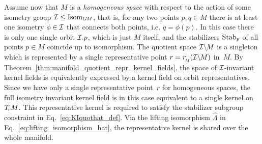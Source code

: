 Assume now that $M$ is a \emph{homogeneous space} with respect to the action of some isometry group $\mathcal{I} \leq \operatorname{Isom}_{G\mkern-1.4muM}$, that is, for any two points $p,q\in M$ there is at least one isometry $\phi \in \mathcal{I}$ that connects both points, i.e. $q = \phi(p)$.
In this case there is only one single orbit $\mathcal{I}.p$, which is just $M$ itself, and the stabilizers $\operatorname{Stab}_{p}$ of all points $p\in M$ coincide up to isomorphism.
The quotient space $\mathcal{I}\backslash\mkern-1.5mu M$ is a singleton which is represented by a single representative point $r = \rM(\IM)$ in~$M$.
By Theorem~\ref{thm:manifold_quotient_repr_kernel_fields}, the space of $\mathcal{I}$-invariant kernel fields is equivalently expressed by a kernel field on orbit representatives.
Since we have only a single representative point~$r$ for homogeneous spaces, the full isometry invariant kernel field is in this case equivalent to a single kernel on~$\TrM$.
This representative kernel is required to satisfy the stabilizer subgroup constraint in Eq.~\eqref{eq:KIquothat_def}.
Via the lifting isomorphism $\widehat{\Lambda}$ in Eq.~\eqref{eq:lifting_isomorphism_hat}, the representative kernel is shared over the whole manifold.


